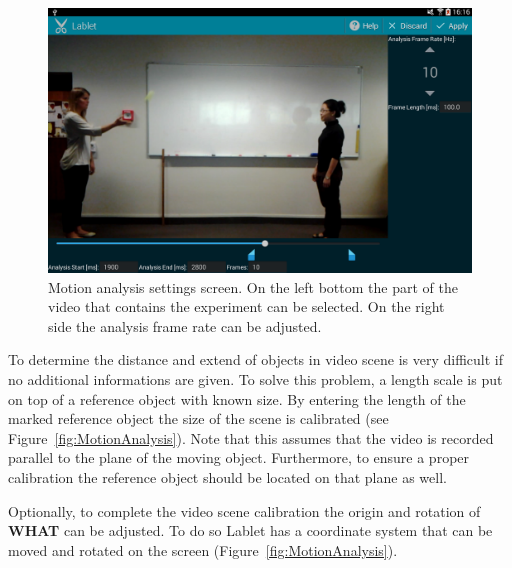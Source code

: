 \documentclass{sigchi}
\begin{document}
\begin{figure}
  \centering
  \includegraphics[width=.99\columnwidth]{MotionAnalysisSettings}
  \caption{Motion analysis settings screen.  On the left bottom the
    part of the video that contains the experiment can be selected.
    On the right side the analysis frame rate can be
    adjusted.\label{fig:MotionAnalysisSettingsScreen} }
\end{figure}

To determine the distance and extend of objects in video scene is very
difficult if no additional informations are given.  To solve this
problem, a length scale is put on top of a reference object with known
size.  By entering the length of the marked reference object the size
of the scene is calibrated (see Figure~\ref{fig:MotionAnalysis}).
Note that this assumes that the video is recorded parallel to the
plane of the moving object.  Furthermore, to ensure a proper
calibration the reference object should be located on that plane as
well.

Optionally, to complete the video scene calibration the origin and
rotation of {\bf WHAT} can be adjusted.  To do so Lablet has a coordinate system
that can be moved and rotated on the screen
(Figure~\ref{fig:MotionAnalysis}).
\end{document}
